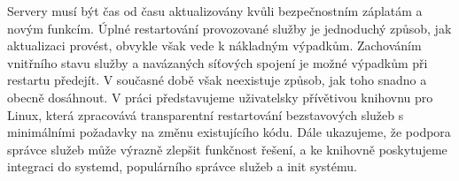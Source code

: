 \documentclass[12pt]{report}
\begin{document}

Servery musí být čas od času aktualizovány kvůli bezpečnostním záplatám a novým funkcím. Úplné restartování provozované služby je jednoduchý způsob, jak aktualizaci provést, obvykle však vede k nákladným výpadkům. Zachováním vnitřního stavu služby a navázaných síťových spojení je možné výpadkům při restartu předejít. V současné době však neexistuje způsob, jak toho snadno a obecně dosáhnout. V práci představujeme uživatelsky přívětivou knihovnu pro Linux, která zpracovává transparentní restartování bezstavových služeb s minimálními požadavky na změnu existujícího kódu. Dále ukazujeme, že podpora správce služeb může výrazně zlepšit funkčnost řešení, a ke knihovně poskytujeme integraci do systemd, populárního správce služeb a init systému.
\end{document}
